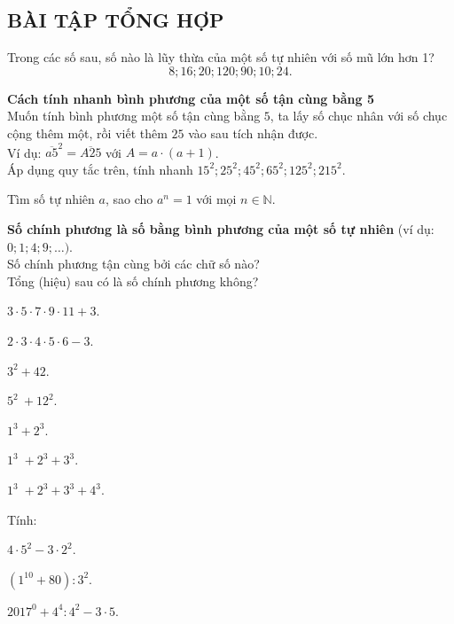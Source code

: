 \begin{bt}
\subsection{BÀI TẬP TỔNG HỢP}
\end{bt}   \begin{bt}
Trong các số sau, số nào là lũy thừa của một số tự nhiên với số mũ lớn hơn 1?
$$8; 16; 20; 120; 90; 10; 24.$$
\end{bt}   \begin{bt}
\textbf{Cách tính nhanh bình phương của một số tận cùng bằng 5}\\
Muốn tính bình phương một số tận cùng bằng $5$, ta lấy số chục nhân với số chục cộng thêm một, rồi viết thêm $25$ vào sau tích nhận được.\\
Ví dụ: ${\overline{a5}^2} = \overline{A25} $ với  $A = a \cdot (a+1)$.\\
Áp dụng quy tắc trên, tính nhanh ${15^2};{25^2};{45^2};{65^2}; {125}^2; {215}^2$.
\end{bt}   \begin{bt}
Tìm số tự nhiên $a$, sao cho ${a^n} = 1$ với mọi $n\in \mathbb{N}$.
\end{bt}   \begin{bt}
\textbf{Số chính phương là số bằng bình phương của một số tự nhiên} \;(ví dụ: $0;1;4;9;\ldots)$. \vspace{0,3cm}\\
Số chính phương tận cùng bởi các chữ số nào?\vspace{0,3cm}\\
Tổng (hiệu) sau có là số chính phương không?
\begin{listEX}[2]
\item $3\cdot 5\cdot 7\cdot 9\cdot 11+3$.
\item $2\cdot 3\cdot 4\cdot 5\cdot 6-3$.
\item ${{3}^{2}}+42$.
\item ${{5}^{2}}~+{{12}^{2}}$.
\item ${{1}^{3}}+{2^3}$.
\item ${1^3}\; + {2^3} + {3^3}$.
\item ${1^3}\; + {2^3} + {3^3} + {4^3}$.
\end{listEX}
\end{bt}   \begin{bt}
Tính:
\begin{listEX}[2]
\item  $4 \cdot {5^2} - 3 \cdot {2^2}$.
\item  $({1^{10}} + 80):{3^2}$.
\item  ${2017^0} + {4^4}:{4^2} - 3 \cdot 5$.

\end{listEX}
\end{bt}
